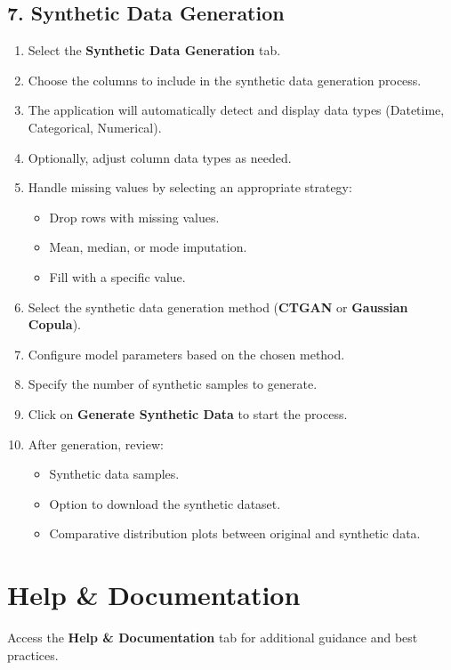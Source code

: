 \documentclass[12pt,a4paper]{article}
\begin{document}
\subsection{7. Synthetic Data Generation}
\label{sec:synthetic_data_generation}
\begin{enumerate}
    \item Select the \textbf{Synthetic Data Generation} tab.
    \item Choose the columns to include in the synthetic data generation process.
    \item The application will automatically detect and display data types (Datetime, Categorical, Numerical).
    \item Optionally, adjust column data types as needed.
    \item Handle missing values by selecting an appropriate strategy:
    \begin{itemize}
        \item Drop rows with missing values.
        \item Mean, median, or mode imputation.
        \item Fill with a specific value.
    \end{itemize}
    \item Select the synthetic data generation method (\textbf{CTGAN} or \textbf{Gaussian Copula}).
    \item Configure model parameters based on the chosen method.
    \item Specify the number of synthetic samples to generate.
    \item Click on \textbf{Generate Synthetic Data} to start the process.
    \item After generation, review:
    \begin{itemize}
        \item Synthetic data samples.
        \item Option to download the synthetic dataset.
        \item Comparative distribution plots between original and synthetic data.
    \end{itemize}
\end{enumerate}

\section{Help \& Documentation}
Access the \textbf{Help \& Documentation} tab for additional guidance and best practices.
\end{document}
